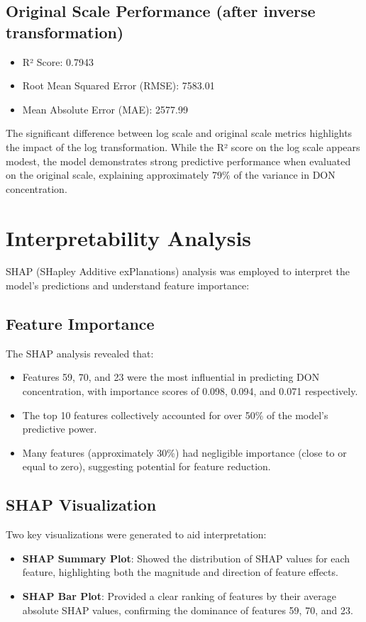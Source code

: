 \documentclass{article}
\begin{document}
\subsection{Original Scale Performance (after inverse transformation)}
\begin{itemize}
    \item R² Score: 0.7943
    \item Root Mean Squared Error (RMSE): 7583.01
    \item Mean Absolute Error (MAE): 2577.99
\end{itemize}

The significant difference between log scale and original scale metrics highlights the impact of the log transformation. While the R² score on the log scale appears modest, the model demonstrates strong predictive performance when evaluated on the original scale, explaining approximately 79\% of the variance in DON concentration.

\section{Interpretability Analysis}
SHAP (SHapley Additive exPlanations) analysis was employed to interpret the model's predictions and understand feature importance:

\subsection{Feature Importance}
The SHAP analysis revealed that:
\begin{itemize}
    \item Features 59, 70, and 23 were the most influential in predicting DON concentration, with importance scores of 0.098, 0.094, and 0.071 respectively.
    
    \item The top 10 features collectively accounted for over 50\% of the model's predictive power.
    
    \item Many features (approximately 30\%) had negligible importance (close to or equal to zero), suggesting potential for feature reduction.
\end{itemize}

\subsection{SHAP Visualization}
Two key visualizations were generated to aid interpretation:
\begin{itemize}
    \item \textbf{SHAP Summary Plot}: Showed the distribution of SHAP values for each feature, highlighting both the magnitude and direction of feature effects.
    
    \item \textbf{SHAP Bar Plot}: Provided a clear ranking of features by their average absolute SHAP values, confirming the dominance of features 59, 70, and 23.
\end{itemize}
\end{document}
